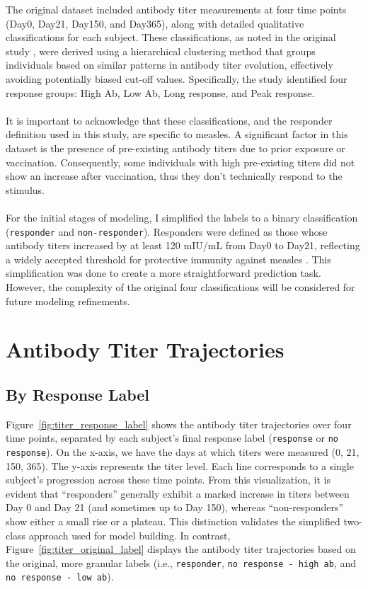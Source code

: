 \documentclass[12pt,a4paper]{report}
\begin{document}
\noindent
The original dataset included antibody titer measurements at four time points (Day0, Day21, Day150, and Day365), along with detailed qualitative classifications for each subject. These classifications, as noted in the original study \cite{bartholomeus2020transcriptomic}, were derived using a hierarchical clustering method that groups individuals based on similar patterns in antibody titer evolution, effectively avoiding potentially biased cut-off values. Specifically, the study identified four response groups: High Ab, Low Ab, Long response, and Peak response.\\
\\
It is important to acknowledge that these classifications, and the responder definition used in this study, are specific to measles. A significant factor in this dataset is the presence of pre-existing antibody titers due to prior exposure or vaccination. Consequently, some individuals with high pre-existing titers did not show an increase after vaccination, thus they don't technically respond to the stimulus.\\
\\
For the initial stages of modeling, I simplified the labels to a binary classification (\texttt{responder} and \texttt{non-responder}). Responders were defined as those whose antibody titers increased by at least 120 mIU/mL from Day0 to Day21, reflecting a widely accepted threshold for protective immunity against measles \cite{chen1990measles}. This simplification was done to create a more straightforward prediction task. However, the complexity of the original four classifications will be considered for future modeling refinements.\\

\section{Antibody Titer Trajectories}

\subsection{By Response Label}
\noindent
Figure~\ref{fig:titer_response_label} shows the antibody titer trajectories over four time points, separated by each subject’s final response label (\texttt{response} or \texttt{no response}). On the x-axis, we have the days at which titers were measured (0, 21, 150, 365). The y-axis represents the titer level. Each line corresponds to a single subject’s progression across these time points. From this visualization, it is evident that “responders” generally exhibit a marked increase in titers between Day 0 and Day 21 (and sometimes up to Day 150), whereas “non-responders” show either a small rise or a plateau. This distinction validates the simplified two-class approach used for model building. In contrast, Figure~\ref{fig:titer_original_label} displays the antibody titer trajectories based on the original, more granular labels (i.e., \texttt{responder}, \texttt{no response - high ab}, and \texttt{no response - low ab}). 
\end{document}
